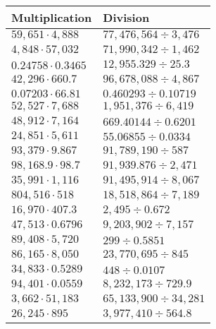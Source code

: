 \begin{longtable}[]{@{}ll@{}}
\toprule
Multiplication & Division\tabularnewline
\midrule
\endhead
\(59,651\cdot4,888\) & \(77,476,564÷3,476\)\tabularnewline
\(4,848\cdot57,032\) & \(71,990,342÷1,462\)\tabularnewline
\(0.24758\cdot0.3465\) & \(12,955.329÷25.3\)\tabularnewline
\(42,296\cdot660.7\) & \(96,678,088÷4,867\)\tabularnewline
\(0.07203\cdot66.81\) & \(0.460293÷0.10719\)\tabularnewline
\(52,527\cdot7,688\) & \(1,951,376÷6,419\)\tabularnewline
\(48,912\cdot7,164\) & \(669.40144÷0.6201\)\tabularnewline
\(24,851\cdot 5,611\) & \(55.06855÷0.0334\)\tabularnewline
\(93,379\cdot9.867\) & \(91,789,190÷587\)\tabularnewline
\(98,168.9\cdot98.7\) & \(91,939.876÷2,471\)\tabularnewline
\(35,991\cdot1,116\) & \(91,495,914÷8,067\)\tabularnewline
\(804,516\cdot518\) & \(18,518,864÷7,189\)\tabularnewline
\(16,970\cdot407.3\) & \(2,495÷0.672\)\tabularnewline
\(47,513\cdot0.6796\) & \(9,203,902÷7,157\)\tabularnewline
\(89,408\cdot5,720\) & \(299÷0.5851\)\tabularnewline
\(86,165\cdot8,050\) & \(23,770,695÷845\)\tabularnewline
\(34,833\cdot0.5289\) & \(448÷0.0107\)\tabularnewline
\(94,401\cdot0.0559\) & \(8,232,173÷729.9\)\tabularnewline
\(3,662\cdot51,183\) & \(65,133,900÷34,281\)\tabularnewline
\(26,245\cdot895\) & \(3,977,410÷564.8\)\tabularnewline
\bottomrule
\end{longtable}
